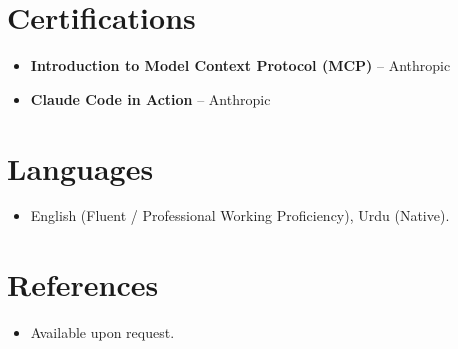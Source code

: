 \documentclass[11pt,a4paper,sans]{moderncv}
\begin{document}

\section{Certifications}
\vspace{1pt}
\begin{itemize}
\item \textbf{Introduction to Model Context Protocol (MCP)} -- Anthropic
\item \textbf{Claude Code in Action} -- Anthropic
\end{itemize}


\section{Languages}
\vspace{1pt}
\begin{itemize}
\item {English (Fluent / Professional Working Proficiency), Urdu (Native).}
\end{itemize}


\section{References}
\vspace{1pt}
\begin{itemize}
\item{Available upon request.}
\end{itemize}
\end{document}
